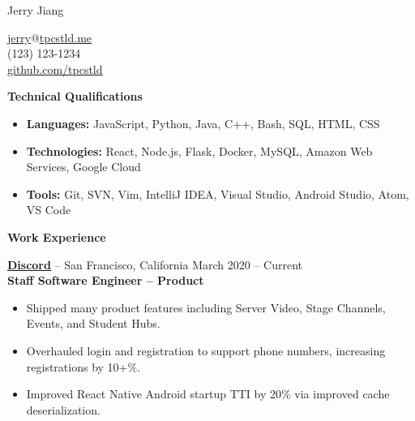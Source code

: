 \documentclass{letter}
\begin{document}
  \thispagestyle{empty}

\begin{bfseries}
\begin{minipage}{0.5\textwidth}
{\Huge Jerry Jiang}
\end{minipage}
\begin{minipage}{\dimexpr 0.5\textwidth-2pt}
  \vspace{2mm}
  \null \hfill {\href{mailto:jerry@tpcstld.me}{\uline{jerry}}@\href{http://tpcstld.me}{\uline{tpcstld.me}} \\
  \null \hfill (123) 123-1234 \\
  \null \hfill \href{https://github.com/tpcstld}{\uline{github.com/tpcstld}}}
\end{minipage}
\end{bfseries}

{\bfseries \Large Technical Qualifications}

\vspace{-10mm}
\null\hrulefill

\vspace{-3mm}
\begin{itemize}
    \item {\bfseries Languages:}
        JavaScript, Python, Java, C++, Bash, SQL, HTML, CSS
    \item {\bfseries Technologies:}
        React, Node.js, Flask, Docker, MySQL, Amazon Web Services, Google Cloud
    \item {\bfseries Tools:}
        Git, SVN, Vim, IntelliJ IDEA, Visual Studio, Android Studio, Atom, VS
        Code
\end{itemize}

{\bfseries \Large Work Experience}

\vspace{-10mm}
\null\hrulefill

\vspace{-1.5mm}
{\bfseries \href{https://discord.com}{\uline{Discord}}} -- San Francisco,
California \hfill March 2020 -- Current \\
{\bfseries Staff Software Engineer -- Product}
\vspace{-3mm}
\begin{itemize}
  \item Shipped many product features including Server Video, Stage Channels, Events, and Student Hubs.
  \item Overhauled login and registration to support phone numbers, increasing registrations by 10+\%.
  \item Improved React Native Android startup TTI by 20\% via improved cache deserialization.
\end{itemize}
\end{document}
